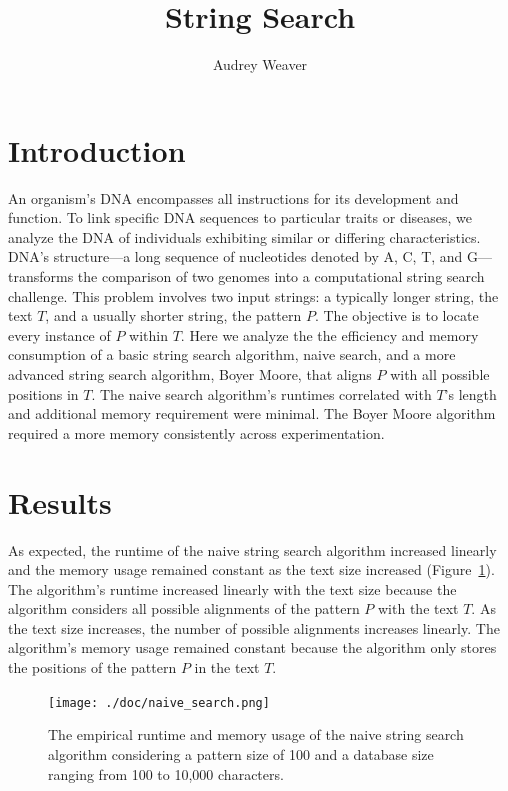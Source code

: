 \documentclass[11pt, letterpaper]{article}
\begin{document}
\title{String Search}
\author{Audrey Weaver}
\maketitle

\section{Introduction}
An organism's DNA encompasses all instructions for its development and
function. To link specific DNA sequences to particular traits or diseases, we
analyze the DNA of individuals exhibiting similar or differing characteristics.
DNA's structure—a long sequence of nucleotides denoted by A, C, T, and
G—transforms the comparison of two genomes into a computational string search
challenge. This problem involves two input strings: a typically longer string,
the text $T$, and a usually shorter string, the pattern $P$. The
objective is to locate every instance of $P$ within $T$. Here we analyze the
the efficiency and memory consumption of a basic string search algorithm, 
naive search, and a more advanced string search algorithm, Boyer Moore, that
aligns $P$ with all possible positions in $T$.  The naive search algorithm's
runtimes correlated with $T$'s length and additional memory requirement were
minimal. The Boyer Moore algorithm required a more memory consistently across
experimentation. 

\section{Results}

As expected, the runtime of the naive string search algorithm increased
linearly and the memory usage remained constant as the text size increased
(Figure~\ref{timeandmem}). The algorithm's runtime increased linearly with
the text size because the algorithm considers all possible alignments of the
pattern $P$ with the text $T$. As the text size increases, the number of
possible alignments increases linearly. The algorithm's memory usage remained
constant because the algorithm only stores the positions of the pattern $P$ in
the text $T$.


\begin{figure}[ht] \centering
    \texttt{[image: ./doc/naive\_search.png]}
    \caption{The empirical runtime and memory usage of the naive string search
    algorithm considering a pattern size of 100 and a database size ranging
    from 100 to 10,000 characters.}
    \label{timeandmem}
\end{figure}
\end{document}
